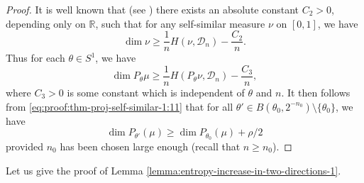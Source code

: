 \documentclass[a4paper,11pt]{amsart}
\theoremstyle{definition}
\numberwithin{equation}{section}
\def\D{\mathcal{D}}
\def\R{\mathbb R}
\begin{document}
\begin{proof}
It is well known that (see \cite[Section 3]{Peres-Solomyak}) there exists an absolute constant $C_2>0$,  depending only on $\R$, such that for any self-similar measure $\nu$ on $[0,1]$, we have
\[
\dim \nu\ge \frac{1}{n}H(\nu,\D_n)-\frac{C_2}{n}.
\]
Thus for each $\theta\in S^1$, we have
\[
\dim P_\theta\mu\ge  \frac{1}{n}H(P_\theta\nu,\D_n)-\frac{C_3}{n},
\]
where $C_3>0$ is some constant which is independent of $\theta$ and $n$.  It then follows from \eqref{eq:proof:thm-proj-self-similar-1:11} that for all $\theta'\in B(\theta_0,2^{-n_0})\setminus \{\theta_0\}$, we have
\[
\dim P_{\theta'}(\mu)\ge \dim P_{\theta_0}(\mu)+\rho/2
\]
provided $n_0$ has been chosen large enough (recall that $n\ge n_0$).
\end{proof}



Let us give the proof of Lemma \ref{lemma:entropy-increase-in-two-directions-1}.
\end{document}
